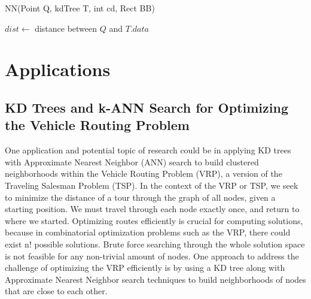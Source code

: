 \documentclass{article}
\begin{document}
            \begin{function}
                \caption{NN(Point Q, kdTree T, int cd, Rect BB)}
                \DontPrintSemicolon

                \KwOut{}


                $dist \gets$ distance between $Q$ and $T.data$\;

            \end{function}

\pagebreak
    \section*{Applications}
    \subsection*{KD Trees and k-ANN Search for Optimizing the Vehicle Routing Problem}
One application and potential topic of research could be in applying KD trees with Approximate Nearest Neighbor (ANN) search to build clustered neighborhoods within the Vehicle Routing Problem (VRP), a version of the Traveling Salesman Problem (TSP). In the context of the VRP or TSP, we seek to minimize the distance of a tour through the graph of all nodes, given a starting position. We must travel through each node exactly once, and return to where we started. Optimizing routes efficiently is crucial for computing solutions, because in combinatorial optimization problems such as the VRP, there could exist n! possible solutions. Brute force searching through the whole solution space is not feasible for any non-trivial amount of nodes. One approach to address the challenge of optimizing the VRP efficiently is by using a KD tree along with Approximate Nearest Neighbor search techniques to build neighborhoods of nodes that are close to each other.
\end{document}
